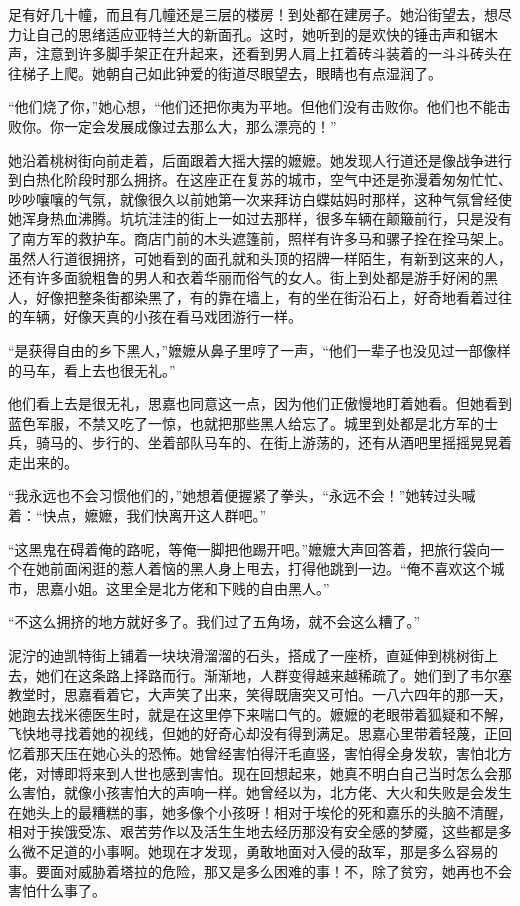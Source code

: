 \par 足有好几十幢，而且有几幢还是三层的楼房！到处都在建房子。她沿街望去，想尽力让自己的思绪适应亚特兰大的新面孔。这时，她听到的是欢快的锤击声和锯木声，注意到许多脚手架正在升起来，还看到男人肩上扛着砖斗装着的一斗斗砖头在往梯子上爬。她朝自己如此钟爱的街道尽眼望去，眼睛也有点湿润了。
\par “他们烧了你，”她心想，“他们还把你夷为平地。但他们没有击败你。他们也不能击败你。你一定会发展成像过去那么大，那么漂亮的！”
\par 她沿着桃树街向前走着，后面跟着大摇大摆的嬷嬷。她发现人行道还是像战争进行到白热化阶段时那么拥挤。在这座正在复苏的城市，空气中还是弥漫着匆匆忙忙、吵吵嚷嚷的气氛，就像很久以前她第一次来拜访白蝶姑妈时那样，这种气氛曾经使她浑身热血沸腾。坑坑洼洼的街上一如过去那样，很多车辆在颠簸前行，只是没有了南方军的救护车。商店门前的木头遮篷前，照样有许多马和骡子拴在拴马架上。虽然人行道很拥挤，可她看到的面孔就和头顶的招牌一样陌生，有新到这来的人，还有许多面貌粗鲁的男人和衣着华丽而俗气的女人。街上到处都是游手好闲的黑人，好像把整条街都染黑了，有的靠在墙上，有的坐在街沿石上，好奇地看着过往的车辆，好像天真的小孩在看马戏团游行一样。
\par “是获得自由的乡下黑人，”嬷嬷从鼻子里哼了一声，“他们一辈子也没见过一部像样的马车，看上去也很无礼。”
\par 他们看上去是很无礼，思嘉也同意这一点，因为他们正傲慢地盯着她看。但她看到蓝色军服，不禁又吃了一惊，也就把那些黑人给忘了。城里到处都是北方军的士兵，骑马的、步行的、坐着部队马车的、在街上游荡的，还有从酒吧里摇摇晃晃着走出来的。
\par “我永远也不会习惯他们的，”她想着便握紧了拳头，“永远不会！”她转过头喊着：“快点，嬷嬷，我们快离开这人群吧。”
\par “这黑鬼在碍着俺的路呢，等俺一脚把他踢开吧。”嬷嬷大声回答着，把旅行袋向一个在她前面闲逛的惹人着恼的黑人身上甩去，打得他跳到一边。“俺不喜欢这个城市，思嘉小姐。这里全是北方佬和下贱的自由黑人。”
\par “不这么拥挤的地方就好多了。我们过了五角场，就不会这么糟了。”
\par 泥泞的迪凯特街上铺着一块块滑溜溜的石头，搭成了一座桥，直延伸到桃树街上去，她们在这条路上择路而行。渐渐地，人群变得越来越稀疏了。她们到了韦尔塞教堂时，思嘉看着它，大声笑了出来，笑得既唐突又可怕。一八六四年的那一天，她跑去找米德医生时，就是在这里停下来喘口气的。嬷嬷的老眼带着狐疑和不解，飞快地寻找着她的视线，但她的好奇心却没有得到满足。思嘉心里带着轻蔑，正回忆着那天压在她心头的恐怖。她曾经害怕得汗毛直竖，害怕得全身发软，害怕北方佬，对博即将来到人世也感到害怕。现在回想起来，她真不明白自己当时怎么会那么害怕，就像小孩害怕大的声响一样。她曾经以为，北方佬、大火和失败是会发生在她头上的最糟糕的事，她多像个小孩呀！相对于埃伦的死和嘉乐的头脑不清醒，相对于挨饿受冻、艰苦劳作以及活生生地去经历那没有安全感的梦魇，这些都是多么微不足道的小事啊。她现在才发现，勇敢地面对入侵的敌军，那是多么容易的事。要面对威胁着塔拉的危险，那又是多么困难的事！不，除了贫穷，她再也不会害怕什么事了。
